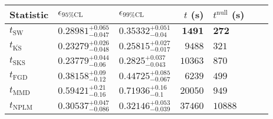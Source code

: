 \begin{tabular}{l|llr|llr}
Statistic & $\epsilon_{95\%\mathrm{CL}}$ & $\epsilon_{99\%\mathrm{CL}}$ & $t$ (s) & $t^{\mathrm{null}}$ (s) \\
	\midrule
	$t_{\mathrm{SW}}$ & $0.28981_{-0.047}^{+0.065}$ & $0.35332_{-0.04}^{+0.051}$ & ${\mathbf{1491}}$ & ${\mathbf{272}}$ \\
	$t_{\overline{\mathrm{KS}}}$ & ${\mathbf{0.23279_{-0.048}^{+0.026}}}$ & ${\mathbf{0.25815_{-0.017}^{+0.027}}}$ & $9488$ & $321$ \\
	$t_{\mathrm{SKS}}$ & $0.23779_{-0.06}^{+0.044}$ & $0.2825_{-0.043}^{+0.037}$ & $10363$ & $870$ \\
	$t_{\mathrm{FGD}}$ & $0.38158_{-0.12}^{+0.09}$ & $0.44725_{-0.067}^{+0.085}$ & $6239$ & $499$ \\
	$t_{\mathrm{MMD}}$ & $0.59421_{-0.16}^{+0.21}$ & $0.71936_{-0.1}^{+0.16}$ & $20050$ & $949$ \\
\rowcolor{red!35}	$t_{\mathrm{NPLM}}$ & $0.30537_{-0.086}^{+0.047}$ & $0.32146_{-0.039}^{+0.053}$ & $37460$ & $10888$ \\
	\bottomrule
\end{tabular}